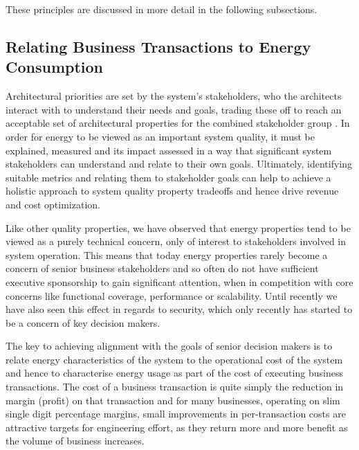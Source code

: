 These principles are discussed in more detail in the following subsections. 

\subsection{Relating Business Transactions to Energy Consumption}

Architectural priorities are set by the system's stakeholders, who the architects interact with to understand their needs and goals, trading these off to reach an acceptable set of architectural properties for the combined stakeholder group \cite{rozanski2011-ssa2e}.  In order for energy to be viewed as an important system quality, it must be explained, measured and its impact assessed in a way that significant system stakeholders can understand and relate to their own goals.  Ultimately, identifying suitable metrics and relating them to stakeholder goals can help to achieve a holistic approach to system quality property tradeoffs and hence drive revenue and cost optimization.

Like other quality properties, we have observed that energy properties tend to be viewed as a purely technical concern, only of interest to stakeholders involved in system operation.  This means that today energy properties rarely become a concern of senior business stakeholders and so often do not have sufficient executive sponsorship to gain significant attention, when in competition with core concerns like functional coverage, performance or scalability.  Until recently we have also seen this effect in regards to security, which only recently has started to be a concern of key decision makers.

The key to achieving alignment with the goals of senior decision makers is to relate energy characteristics of the system to the operational cost of the system and hence to characterise energy usage as part of the cost of executing business transactions.  The cost of a business transaction is quite simply the reduction in margin (profit) on that transaction and for many businesses, operating on slim single digit percentage margins, small improvements in per-transaction costs are attractive targets for engineering effort, as they return more and more benefit as the volume of business increases.

